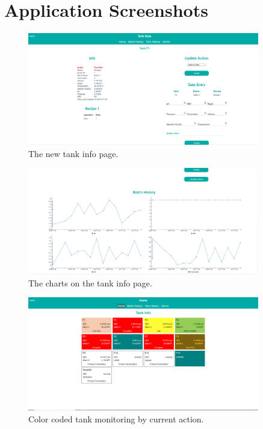 \documentclass[draftclsnofoot,onecolumn,journal,letterpaper,compsoc,10pt]{IEEEtran}
\begin{document}
\section{Application Screenshots}

\begin{figure}[H]
    \centering
    \includegraphics[width=0.9\textwidth]{screenshots/progress_report_screencap-tank_info.png}
    \caption{The new tank info page.}
\end{figure}

\begin{figure}[H]
    \centering
    \includegraphics[width=0.9\textwidth]{screenshots/progress_report_screencap-tank_info_charts.png}
    \caption{The charts on the tank info page.}
\end{figure}

\begin{figure}[H]
    \centering
    \includegraphics[width=0.9\textwidth]{screenshots/progress_report_screencap-tank_monitoring.png}
    \caption{Color coded tank monitoring by current action.}
\end{figure}
\end{document}
